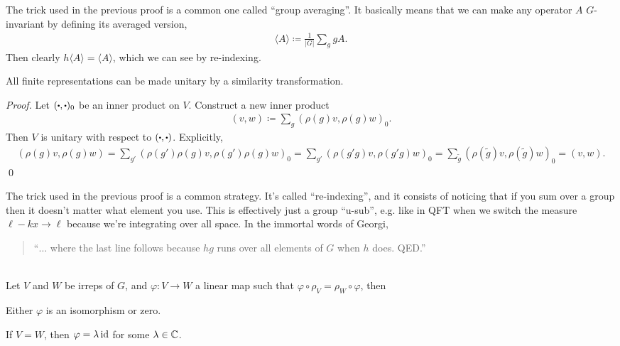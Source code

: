 \documentclass[11pt]{article}
\begin{document}
\begin{nnote}
    The trick used in the previous proof is a common one called
    ``group averaging''. It basically means that we can make any
    operator $A$ $G$-invariant by defining its averaged version,
    \begin{align*}
        \langle A \rangle \coloneqq \frac{1}{|G|} \sum_g g A.
    \end{align*}
    Then clearly $h\langle A \rangle = \langle A \rangle$, which we can see by re-indexing.
\end{nnote}

\begin{theorem}
    All finite representations can be made unitary by a similarity transformation.
\end{theorem}

\begin{proof}
    Let $(\sbullet, \sbullet)_0$ be an inner product on $V$. Construct a new inner product
    \begin{align*}
        (v, w) \coloneqq \sum_g (\rho(g)v, \rho(g)w)_0.
    \end{align*}
    Then $V$ is unitary with respect to $(\sbullet, \sbullet)$. Explicitly,
    \begin{align*}
        (\rho(g)v, \rho(g)w) = \sum_{g'} (\rho(g')\rho(g)v, \rho(g')\rho(g)w)_0
        = \sum_{g'} (\rho(g'g)v, \rho(g'g)w)_0 = \sum_{\tilde{g}} (\rho(\tilde{g})v, \rho(\tilde{g})w)_0 = (v, w).
    \end{align*}
    \qed
\end{proof}

\begin{nnote}
    The trick used in the previous proof is a common strategy.
    It's called ``re-indexing'', and it consists of
    noticing that if you sum over a group then it doesn't matter what 
    element you use. This is effectively just a group ``u-sub'', e.g. like
    in QFT when we switch the measure $\ell - kx \to \ell$ because we're integrating
    over all space. In the immortal words of Georgi,
    \begin{quote}
        ``$\ldots$ where the last line follows because $hg$ runs over all
        elements of $G$ when $h$ does. QED.''
    \end{quote}
\end{nnote}

\begin{theorem}{}\\
    Let $V$ and $W$ be irreps of $G$, and $\varphi \colon V \to W$
    a linear map such that $ \varphi \circ \rho_V = \rho_W \circ \varphi$, 
    then
    \begin{alphamerate}
        \item Either $\varphi$ is an isomorphism or zero.
        \item If $V = W$, then $\varphi = \lambda \operatorname{id}$ for some $\lambda \in \mathbb{C}$.
    \end{alphamerate}
\end{theorem}
\end{document}
